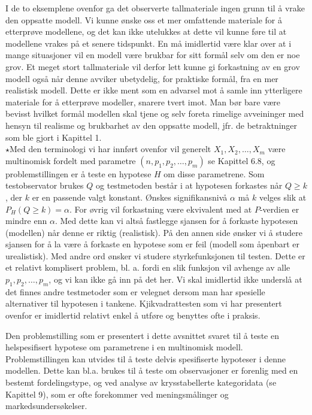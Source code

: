I de to eksemplene ovenfor ga det observerte tallmateriale ingen
grunn til å vrake den oppsatte modell. Vi kunne ønske oss et mer
omfattende materiale for å etterprøve modellene, og det kan ikke
utelukkes at dette vil kunne føre til at modellene vrakes på et
senere tidspunkt. En må imidlertid være klar over at i mange
situasjoner vil en modell være brukbar for sitt formål selv om
den er noe grov. Et meget stort tallmateriale vil derfor lett
kunne gi forkastning av en grov modell også når denne avviker
ubetydelig, for praktiske formål, fra en mer realistisk modell.
Dette er ikke ment som en advarsel mot å samle inn ytterligere
materiale for å etterprøve modeller,
snarere tvert imot. Man bør bare være bevisst hvilket formål
modellen skal tjene og selv foreta rimelige avveininger med
hensyn til realisme og brukbarhet av den oppsatte modell, jfr. de
betraktninger som ble gjort i Kapittel 1. \\

\small
 $\star$Med den terminologi vi har innført ovenfor vil generelt $X_1,
X_2, \ldots, X_m$ være multinomisk fordelt med parametre $(n,
p_1, p_2, \ldots , p_m)$ se Kapittel 6.8, og problemstillingen er å
teste en hypotese $H$ om disse parametrene. Som testobservator
brukes $Q$ og testmetoden består i at hypotesen forkastes når
$Q\geq k$, der $k$ er en passende valgt konstant. Ønskes
signifikansnivå $\alpha$ må $k$ velges slik at $P_H(Q\geq k) = \alpha$.
 For øvrig vil forkastning være ekvivalent
med at $P$-verdien er mindre enn $\alpha$. Med dette kan vi altså
fastlegge sjansen for å forkaste hypotesen (modellen) når denne
er riktig (realistisk). På den annen side ønsker vi å studere
sjansen for å la være å forkaste en hypotese som er feil (modell
som åpenbart er urealistisk). Med andre ord ønsker vi studere
styrkefunksjonen til testen. Dette er et relativt komplisert
problem, bl. a. fordi en slik funksjon vil avhenge av alle
$p_1, p_2,\ldots ,p_m$, og vi kan ikke
gå inn på det her. Vi skal imidlertid ikke underslå at det finnes
andre testmetoder som er velegnet dersom man har spesielle
alternativer til hypotesen i tankene. Kjikvadrattesten som vi har
presentert ovenfor er imidlertid relativt enkel å utføre og
benyttes ofte i praksis.

Den problemstilling som er presentert i dette avsnittet svaret
til å teste en helspesifisert hypotese om parametrene i en
multinomisk modell. Problemstillingen kan utvides til å teste
delvis spesifiserte hypoteser i denne modellen. Dette kan bl.a.
brukes til å teste om observasjoner er forenlig med en bestemt
forde\-lingstype, og ved analyse av krysstabellerte kategoridata 
(se Kapittel 9), som er ofte forekommer ved meningsmålinger og
markedsundersøkelser.
\normalsize

